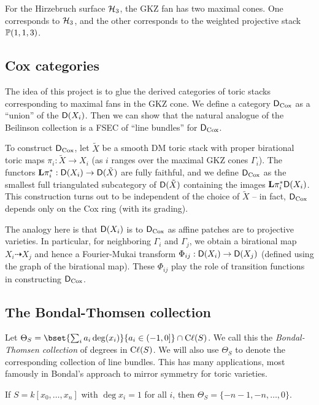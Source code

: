 \documentclass{article}
\begin{document}
\begin{ex}
	For the Hirzebruch surface $\mathcal{H}_3$, the GKZ fan has two maximal cones.
	One corresponds to $\mathcal{H}_3$, and the other corresponds to the weighted projective stack $\mathbb{P}(1, 1, 3)$.
\end{ex}

\subsection{Cox categories}

The idea of this project is to glue the derived categories of toric stacks corresponding to maximal fans in the GKZ cone.
We define a category $\mathsf{D}_{\operatorname{Cox}}$ as a ``union'' of the $\mathsf{D}(X_i)$.
Then we can show that the natural analogue of the Beilinson collection is a FSEC of ``line bundles'' for $\mathsf{D}_{\operatorname{Cox}}$.

To construct $\mathsf{D}_{\operatorname{Cox}}$, let $\tilde{X}$ be a smooth DM toric stack with proper birational toric maps $\pi_i: \tilde{X} \to X_i$ (as $i$ ranges over the maximal GKZ cones $\Gamma_i$).
The functors $\mathbf{L} \pi_i^*: \mathsf{D}(X_i) \to \mathsf{D}(\tilde{X})$ are fully faithful, and we define $\mathsf{D}_{\operatorname{Cox}}$ as the smallest full triangulated subcategory of $\mathsf{D}(\tilde{X})$ containing the images $\mathbf{L} \pi_i^* \mathsf{D}(X_i)$.
This construction turns out to be independent of the choice of $\tilde{X}$ -- in fact, $\mathsf{D}_{\operatorname{Cox}}$ depends only on the Cox ring (with its grading).

The analogy here is that $\mathsf{D}(X_i)$ is to $\mathsf{D}_{\operatorname{Cox}}$ as affine patches are to projective varieties.
In particular, for neighboring $\Gamma_i$ and $\Gamma_j$, we obtain a birational map $X_i \dashrightarrow X_j$ and hence a Fourier-Mukai transform $\Phi_{ij}: \mathsf{D}(X_i) \to \mathsf{D}(X_j)$ (defined using the graph of the birational map).
These $\Phi_{ij}$ play the role of transition functions in constructing $\mathsf{D}_{\operatorname{Cox}}$.

\subsection{The Bondal-Thomsen collection}

Let $\Theta_S = \bset{\sum_i a_i \deg(x_i)}{a_i \in (-1, 0]} \cap \Cl(S)$.
We call this the \emph{Bondal-Thomsen collection} of degrees in $\operatorname{C\ell}(S)$.
We will also use $\Theta_S$ to denote the corresponding collection of line bundles.
This has many applications, most famously in Bondal's approach to mirror symmetry for toric varieties.

\begin{ex}
	If $S = k[x_0, \dots, x_n]$ with $\deg x_i = 1$ for all $i$, then $\Theta_S = \{ -n - 1, -n, \dots, 0 \}$.
\end{ex}
\end{document}
